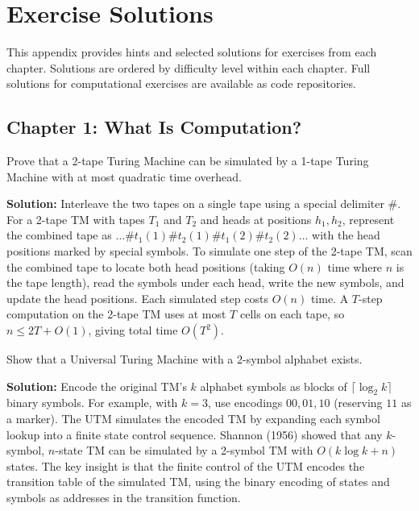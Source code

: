 
\chapter{Exercise Solutions}
\label{app:solutions}
This appendix provides hints and selected solutions for exercises from each chapter. Solutions are ordered by difficulty level within each chapter. Full solutions for computational exercises are available as code repositories.

\section{Chapter 1: What Is Computation?}

\begin{exercise}[Basic]
Prove that a 2-tape Turing Machine can be simulated by a 1-tape Turing Machine with at most quadratic time overhead.
\end{exercise}
\textbf{Solution:} Interleave the two tapes on a single tape using a special delimiter $\#$. For a 2-tape TM with tapes $T_1$ and $T_2$ and heads at positions $h_1, h_2$, represent the combined tape as $\ldots \# t_1(1)\# t_2(1) \# t_1(2)\# t_2(2) \ldots$ with the head positions marked by special symbols. To simulate one step of the 2-tape TM, scan the combined tape to locate both head positions (taking $O(n)$ time where $n$ is the tape length), read the symbols under each head, write the new symbols, and update the head positions. Each simulated step costs $O(n)$ time. A $T$-step computation on the 2-tape TM uses at most $T$ cells on each tape, so $n \le 2T + O(1)$, giving total time $O(T^2)$.

\begin{exercise}[Intermediate]
Show that a Universal Turing Machine with a 2-symbol alphabet exists.
\end{exercise}
\textbf{Solution:} Encode the original TM's $k$ alphabet symbols as blocks of $\lceil \log_2 k \rceil$ binary symbols. For example, with $k = 3$, use encodings $00, 01, 10$ (reserving $11$ as a marker). The UTM simulates the encoded TM by expanding each symbol lookup into a finite state control sequence. Shannon (1956) showed that any $k$-symbol, $n$-state TM can be simulated by a 2-symbol TM with $O(k \log k + n)$ states. The key insight is that the finite control of the UTM encodes the transition table of the simulated TM, using the binary encoding of states and symbols as addresses in the transition function.

